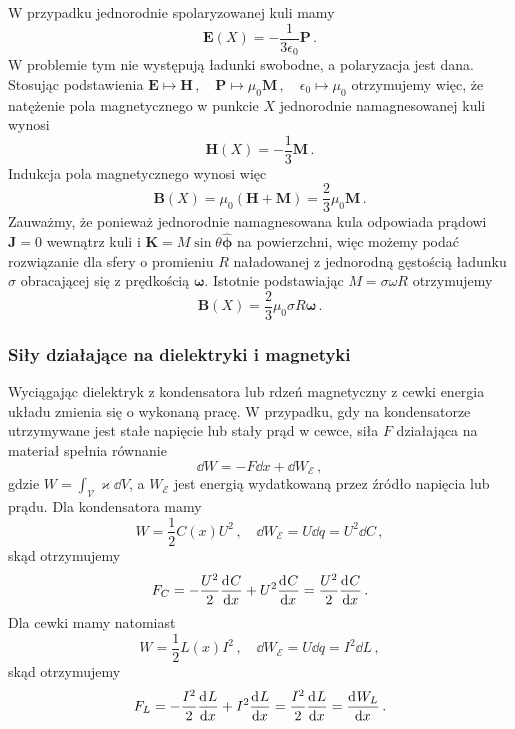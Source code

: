\documentclass[../main.tex]{subfiles}
\begin{document}
\begin{enumerate}
    W przypadku jednorodnie spolaryzowanej kuli mamy
    \begin{equation*}
        \mathbf{E}(X)=-\frac{1}{3\epsilon_0}\mathbf{P}\,.
    \end{equation*}
    W problemie tym nie występują ładunki swobodne, a polaryzacja jest dana. Stosując podstawienia \(\mathbf{E}\mapsto\mathbf{H}\,,\quad \mathbf{P}\mapsto\mu_0\mathbf{M}\,,\quad\epsilon_0\mapsto\mu_0\) otrzymujemy więc, że natężenie pola magnetycznego w punkcie \(X\) jednorodnie namagnesowanej kuli wynosi
    \begin{equation*}
        \mathbf{H}(X)=-\frac{1}{3}\mathbf{M}\,.
    \end{equation*}
    Indukcja pola magnetycznego wynosi więc
    \begin{equation*}
        \mathbf{B}(X)=\mu_0(\mathbf{H}+\mathbf{M})=\frac{2}{3}\mu_0\mathbf{M}\,.
    \end{equation*}
    Zauważmy, że ponieważ jednorodnie namagnesowana kula odpowiada prądowi \(\mathbf{J}=0\) wewnątrz kuli i \(\mathbf{K}=M\sin\theta\boldsymbol{\hat{\phi}}\) na powierzchni, więc możemy podać rozwiązanie dla sfery o promieniu \(R\) naładowanej z jednorodną gęstością ładunku \(\sigma\) obracającej się z prędkością \(\boldsymbol{\omega}\). Istotnie podstawiając \(M=\sigma\omega R\) otrzymujemy
    \begin{equation*}
        \mathbf{B}(X)=\frac{2}{3}\mu_0\sigma R\boldsymbol{\omega}\,.
    \end{equation*}
\end{enumerate}
\subsubsection{Siły działające na dielektryki i magnetyki}
Wyciągając dielektryk z kondensatora lub rdzeń magnetyczny z cewki energia układu zmienia się o wykonaną pracę. W przypadku, gdy na kondensatorze utrzymywane jest stałe napięcie lub stały prąd w cewce, siła \(F\) działająca na materiał spełnia równanie
\begin{equation*}
    \dd{W}=-F\dd{x}+\dd{W}_\mathcal{E}\,,
\end{equation*}
gdzie \(W=\int_\mathcal{V}\varkappa\dd{V}\), a \(W_\mathcal{E}\) jest energią wydatkowaną przez źródło napięcia lub prądu. Dla kondensatora mamy
\begin{equation*}
    W=\frac{1}{2}C(x)U^2\,,\quad \dd{W}_\mathcal{E}=U\dd{q}=U^2\dd{C}\,,
\end{equation*}
skąd otrzymujemy
\begin{equation*}
    F_C=-\frac{U^2}{2}\dv[]{C}{x}+U^2\dv[]{C}{x}=\frac{U^2}{2}\dv[]{C}{x}\,.
\end{equation*}
Dla cewki mamy natomiast
\begin{equation*}
     W=\frac{1}{2}L(x)I^2\,,\quad \dd{W}_\mathcal{E}=U\dd{q}=I^2\dd{L}\,,
\end{equation*}
skąd otrzymujemy
\begin{equation*}
    F_L=-\frac{I^2}{2}\dv[]{L}{x}+I^2\dv[]{L}{x}=\frac{I^2}{2}\dv[]{L}{x}=\dv[]{W_L}{x}\,.
\end{equation*}
\end{document}
